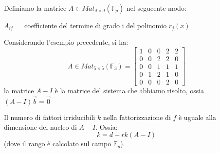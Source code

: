 \documentclass[10pt,a4paper,twoside]{book}
\begin{document}
Definiamo la matrice $A \in Mat_{d \times d}(\mathbb{F}_p)$ nel segueente modo:

$A_{ij} = $ coefficiente del termine di grado i del polinomio $r_j(x)$
\begin{example}
    Considerando l'esempio precedente, si ha:
    \begin{equation*}
        A \in Mat_{5 \times 5}(\mathbb{F}_3) =
        \begin{bmatrix}
            1 & 0 & 0 & 2 & 2 \\
            0 & 0 & 2 & 2 & 0 \\
            0 & 0 & 1 & 1 & 1 \\
            0 & 1 & 2 & 1 & 0 \\
            0 & 0 & 0 & 2 & 0
        \end{bmatrix}
    \end{equation*}
    la matrice $A - I$ è la matrice del sistema che abbiamo risolto, ossia $(A - I)\overrightarrow{b} = \overrightarrow{0}$
\end{example}

\begin{theorem}
    Il numero di fattori irriducibili $k$ nella fattorizzazione di $f$ è uguale alla dimensione del nucleo di $A - I$. Ossia:
    \begin{equation*}
        k = d - rk(A - I)
    \end{equation*}
    (dove il rango è calcolato sul campo $\mathbb{F}_p$).
\end{theorem}
\end{document}
